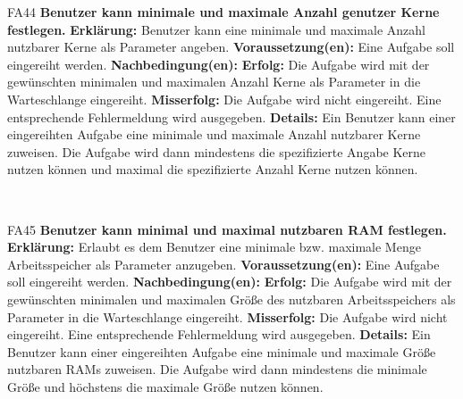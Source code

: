 \documentclass[a4paper,12pt]{article}
\begin{document}
\begin{itemize}[nosep]
	\begin{minipage}[t]{\linewidth}
		\item[FA44] \textbf{Benutzer kann minimale und maximale Anzahl genutzer Kerne festlegen.}
		\subitem \textbf{Erklärung:} \gls{Benutzer} kann eine minimale und maximale Anzahl nutzbarer Kerne als \gls{Parameter} angeben.
		\subitem \textbf{Voraussetzung(en):} Eine \gls{Aufgabe} soll eingereiht werden.
		\subitem \textbf{Nachbedingung(en):}
		\subsubitem \textbf{Erfolg:} Die \gls{Aufgabe} wird mit der gewünschten minimalen und maximalen Anzahl Kerne als \gls{Parameter} in die \gls{Warteschlange} eingereiht.
		\subsubitem \textbf{Misserfolg:} Die \gls{Aufgabe} wird nicht eingereiht. Eine entsprechende Fehlermeldung wird ausgegeben.
		\subitem \textbf{Details:} Ein \gls{Benutzer} kann einer eingereihten \gls{Aufgabe} eine minimale und maximale Anzahl nutzbarer Kerne zuweisen. Die \gls{Aufgabe} wird dann mindestens die spezifizierte Angabe Kerne nutzen können und maximal die spezifizierte Anzahl Kerne nutzen können.
	\end{minipage}
	\newline
	\\
	
	\begin{minipage}[t]{\linewidth}
		\item[FA45] \textbf{Benutzer kann minimal und maximal nutzbaren RAM festlegen.}
		\subitem \textbf{Erklärung:} Erlaubt es dem \gls{Benutzer} eine minimale bzw. maximale Menge Arbeitsspeicher als \gls{Parameter} anzugeben.
		\subitem \textbf{Voraussetzung(en):} Eine \gls{Aufgabe} soll eingereiht werden.
		\subitem \textbf{Nachbedingung(en):}
		\subsubitem \textbf{Erfolg:} Die \gls{Aufgabe} wird mit der gewünschten minimalen und maximalen Größe des nutzbaren Arbeitsspeichers als \gls{Parameter} in die \gls{Warteschlange} eingereiht.
		\subsubitem \textbf{Misserfolg:} Die \gls{Aufgabe} wird nicht eingereiht. Eine entsprechende Fehlermeldung wird ausgegeben.
		\subitem \textbf{Details:} Ein \gls{Benutzer} kann einer eingereihten \gls{Aufgabe} eine minimale und maximale Größe nutzbaren RAMs zuweisen. Die \gls{Aufgabe} wird dann mindestens die minimale Größe und höchstens die maximale Größe nutzen können.
	\end{minipage}
	\newline
	\\
	

\end{itemize}
\end{document}
